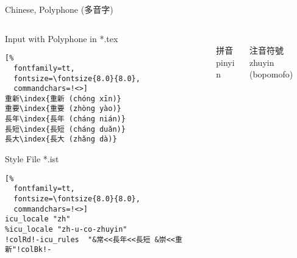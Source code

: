 \documentclass[aspectratio=169,10pt]{beamer}
\begin{document}
\begin{frame}[fragile]{Chinese, Polyphone (多音字)}

\begin{columns}
\begin{column}{55mm}

\setmonofont{Noto Sans Mono CJK TC}
\setsansfont{Noto Sans}
\begin{exampleblock}{Input with Polyphone in *.tex}
\begin{Verbatim}[%
  fontfamily=tt,
  fontsize=\fontsize{8.0}{8.0},
  commandchars=!<>]
重新\index{重新 (chóng xīn)}
重要\index{重要 (zhòng yào)}
長年\index{長年 (cháng nián)}
長短\index{長短 (cháng duǎn)}
長大\index{長大 (zhǎng dà)}
\end{Verbatim}
\end{exampleblock}

\begin{exampleblock}{Style File *.ist}
\begin{Verbatim}[%
  fontfamily=tt,
  fontsize=\fontsize{8.0}{8.0},
  commandchars=!<>]
icu_locale "zh"
%icu_locale "zh-u-co-zhuyin"
!colRd!-icu_rules  "&常<<長年<<長短 &崇<<重新"!colBk!-
\end{Verbatim}
\end{exampleblock}
\end{column}

\begin{column}{38mm}
\begin{center}
\\[2mm]%
拼音\\
pinyin
\end{center}
\end{column}

\begin{column}{38mm}
\begin{center}
\\[2mm]%
注音符號\\
zhuyin (bopomofo)
\end{center}
\end{column}
\end{columns}

\end{frame}

\end{document}

